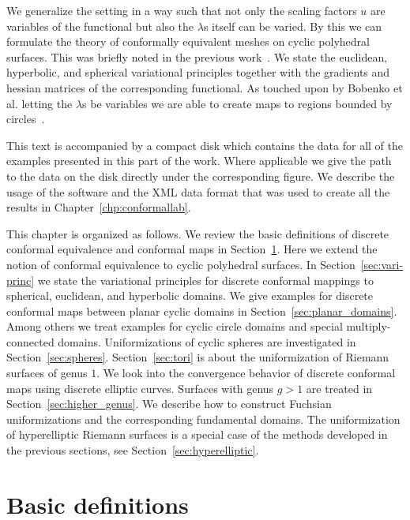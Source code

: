 \documentclass[Thesis]{subfiles}
\begin{document}
We generalize the setting in a way such that not only the scaling factors $u$ are variables of the functional but also the $\lambda$s itself can be varied. 
By this we can formulate the theory of conformally equivalent meshes on cyclic polyhedral surfaces. 
This was briefly noted in the previous work~\cite[p. 2211]{Bobenko2010}.
We state the euclidean, hyperbolic, and spherical variational principles together with the gradients and hessian matrices of the corresponding functional. 
As touched upon by Bobenko et al. letting the $\lambda$s be variables we are able to create maps to regions bounded by circles~\cite[p. 2212]{Bobenko2010}.

This text is accompanied by a compact disk which contains the data for all of the examples presented in this part of the work. 
Where applicable we give the path to the data on the disk directly under the corresponding figure.
We describe the usage of the software and the XML data format that was used to create all the results in Chapter~\ref{chp:conformallab}.


This chapter is organized as follows. We review the basic definitions of discrete conformal equivalence and conformal maps in Section~\ref{sec:basic_definitions}. Here we extend the notion of conformal equivalence to cyclic polyhedral surfaces.
In Section~\ref{sec:vari-princ} we state the variational principles for discrete conformal mappings to spherical, euclidean, and hyperbolic domains.
We give examples for discrete conformal maps between planar cyclic domains in Section~\ref{sec:planar_domains}. 
Among others we treat examples for cyclic circle domains and special multiply-connected domains.
Uniformizations of cyclic spheres are investigated in Section~\ref{sec:spheres}.
Section~\ref{sec:tori} is about the uniformization of Riemann surfaces of genus $1$.
We look into the convergence behavior of discrete conformal maps using discrete elliptic curves.
 Surfaces with genus $g>1$ are treated in Section~\ref{sec:higher_genus}.
 We describe how to construct Fuchsian uniformizations and the corresponding fundamental domains.
 The uniformization of hyperelliptic Riemann surfaces is a special case of the methods developed in the previous sections, see Section~\ref{sec:hyperelliptic}.

\section{Basic definitions}
\label{sec:basic_definitions}
\end{document}
